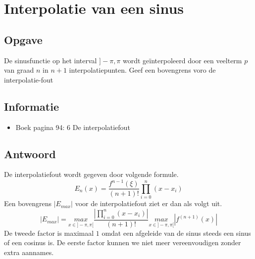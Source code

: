 \documentclass[examenvragen.tex]{subfiles}
\begin{document}
\section{Interpolatie van een sinus}
\subsection{Opgave}
De sinusfunctie op het interval $]-\pi,\pi$ wordt ge\"interpoleerd door een veelterm $p$ van graad $n$ in $n+1$ interpolatiepunten.
Geef een bovengrens voro de interpolatie-fout

\subsection{Informatie}
\begin{itemize}
\item Boek pagina 94: 6 De interpolatiefout
\end{itemize}

\subsection{Antwoord}
De interpolatiefout wordt gegeven door volgende formule.
\[
E_{n}(x) = \frac{f^{n-1}(\xi)}{(n+1)!}\prod_{i=0}^{n}(x-x_i)
\]
Een bovengrens $|E_{max}|$ voor de interpolatiefout ziet er dan als volgt uit.
\[
|E_{max}| = \underset{x\in]-\pi,\pi[}{max}\frac{\left|\prod_{i=0}^{n}(x-x_i)\right|}{(n+1)!}\underset{x\in]-\pi,\pi[}{max}|f^{(n+1)}(x)|
\]
De tweede factor is maximaal $1$ omdat een afgeleide van de sinus steeds een sinus of een cosinus is.
De eerste factor kunnen we niet meer vereenvoudigen zonder extra aannames.
\end{document}
